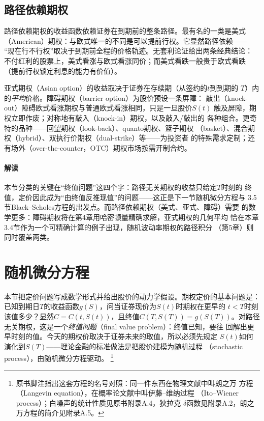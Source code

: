 \subsection{路径依赖期权}

路径依赖期权的收益函数依赖证券在到期前的整条路径。最有名的一类是美式
（American）期权：与欧式唯一的不同是可以提前行权。它显然路径依赖——
“现在行不行权”取决于到期前全程的价格轨迹。无套利论证给出两条经典结论：
不付红利的股票上，美式看涨与欧式看涨同价；而美式看跌一般贵于欧式看跌
（提前行权锁定利息的能力有价值）。

亚式期权（Asian option）的收益取决于证券在存续期（从签约的$t$到到期的
$T$）内的\emph{平均}价格。障碍期权（barrier option）为股价预设一条屏障：
敲出（knock-out）障碍欧式看涨期权与普通欧式看涨相同，只是一旦股价$S(t)$
触及屏障，期权立即作废；对称地有敲入（knock-in）期权，以及敲入/敲出的
各种组合。更奇特的品种——回望期权（look-back）、quanto期权、篮子期权
（basket）、混合期权（hybrid）、双执行价期权（dual-strike）等——为投资者
的特殊需求定制；还有场外（over-the-counter，OTC）期权市场按需开制合约。

\paragraph{解读}
本节分类的关键在“终值问题”这四个字：路径无关期权的收益只给定$T$时刻的
终值，定价因此成为“由终值反推现值”的问题——这正是下一节随机微分方程与
3.5节Black--Scholes方程的出发点。而路径依赖期权（美式、亚式、障碍）需要
的数学更多：障碍期权将在第4章用哈密顿量精确求解，亚式期权的几何平均
恰在本章3.4节作为一个可精确计算的例子出现，随机波动率期权的路径积分
（第5章）则同时覆盖两类。

\section{随机微分方程}

本节把定价问题写成数学形式并给出股价的动力学假设。期权定价的基本问题是：
已知到期日$T$的收益函数$g(S)$，问当证券现价为$S(t)$时期权在更早的
$t<T$时刻该值多少？显然$C=C(t,S(t))$，且终值$C(T,S(T))=g(S(T))$。对路径
无关期权，这是一个\emph{终值问题}（final value problem）：终值已知，要往
回解出更早时刻的值。今天的期权价取决于证券未来的取值，所以必须先规定
$S(t)$如何演化到$S(T)$——理论金融的标准做法是把股价建模为随机过程
（stochastic process），由随机微分方程驱动。
\footnote{原书脚注指出这套方程的名号对照：同一件东西在物理文献中叫朗之万
方程（Langevin equation），在概率论文献中叫伊藤--维纳过程
（Ito--Wiener process）；白噪声的统计性质见原书附录A.4，狄拉克
$\delta$函数见附录A.2，朗之万方程的简介见附录A.5。}

